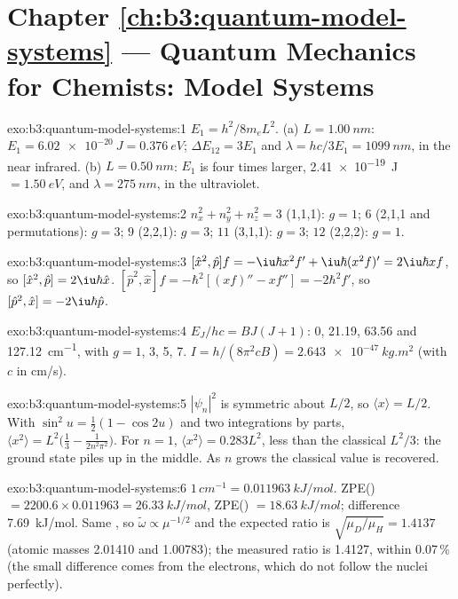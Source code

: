 \section*{Chapter \ref{ch:b3:quantum-model-systems} --- Quantum Mechanics for Chemists: Model Systems}

\begin{solution}{exo:b3:quantum-model-systems:1}
$E_1 = h^2/8m_eL^2$. (a) $L = \qty{1.00}{nm}$: $E_1 = \qty{6.02e-20}{J} =
\qty{0.376}{eV}$; $\Delta E_{12} = 3E_1$ and $\lambda = hc/3E_1 =
\qty{1099}{nm}$, in the near infrared. (b) $L = \qty{0.50}{nm}$: $E_1$ is four
times larger, \qty{2.41e-19}{J} $= \qty{1.50}{eV}$, and $\lambda =
\qty{275}{nm}$, in the ultraviolet.
\end{solution}

\begin{solution}{exo:b3:quantum-model-systems:2}
$n_x^2 + n_y^2 + n_z^2 = 3$ (1,1,1): $g = 1$; $6$ (2,1,1 and permutations):
$g = 3$; $9$ (2,2,1): $g = 3$; $11$ (3,1,1): $g = 3$; $12$ (2,2,2): $g = 1$.
\end{solution}

\begin{solution}{exo:b3:quantum-model-systems:3}
$[\hat x^2,\hat p]f = -\iu\hbar x^2f' + \iu\hbar(x^2f)' = 2\iu\hbar xf$, so
$[\hat x^2,\hat p] = 2\iu\hbar\hat x$. $[\hat p^2,\hat x]f = -\hbar^2[(xf)'' -
xf''] = -2\hbar^2f'$, so $[\hat p^2,\hat x] = -2\iu\hbar\hat p$.
\end{solution}

\begin{solution}{exo:b3:quantum-model-systems:4}
$E_J/hc = BJ(J+1)$: 0, 21.19, 63.56 and \qty{127.12}{cm^{-1}}, with $g = 1$,
3, 5, 7. $I = h/(8\pi^2cB) = \qty{2.643e-47}{kg.m^2}$ (with $c$ in
\unit{cm/s}).
\end{solution}

\begin{solution}{exo:b3:quantum-model-systems:5}
$|\psi_n|^2$ is symmetric about $L/2$, so $\langle x\rangle = L/2$. With
$\sin^2u = \frac12(1 - \cos2u)$ and two integrations by parts,
$\langle x^2\rangle = L^2\big(\frac13 - \frac{1}{2n^2\pi^2}\big)$. For $n = 1$,
$\langle x^2\rangle = 0.283L^2$, less than the classical $L^2/3$: the ground
state piles up in the middle. As $n$ grows the classical value is recovered.
\end{solution}

\begin{solution}{exo:b3:quantum-model-systems:6}
$1\,\unit{cm^{-1}} = \qty{0.011963}{kJ/mol}$. ZPE() $= 2200.6 \times
0.011963 = \qty{26.33}{kJ/mol}$, ZPE() $= \qty{18.63}{kJ/mol}$; difference
\qty{7.69}{kJ/mol}. Same , so $\tilde\omega \propto \mu^{-1/2}$
and the expected ratio is $\sqrt{\mu_D/\mu_H} = 1.4137$ (atomic masses
2.01410 and 1.00783); the measured ratio is 1.4127, within 0.07\,\% (the
small difference comes from the electrons, which do not follow the nuclei
perfectly).
\end{solution}

